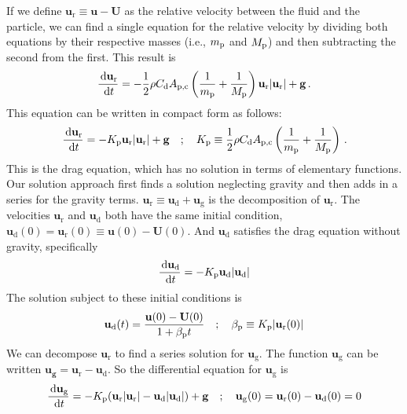 If we define $\mathbf{u}_\text{r} \equiv \mathbf{u} - \mathbf{U}$ as the relative velocity between the fluid and the particle, we can find a single equation for the relative velocity by dividing both equations by their respective masses (i.e., $m_{\rm p}$ and $M_{\rm p}$) and then subtracting the second from the first. This result is
\begin{align}
    \frac{\,\mathrm{d} \mathbf{u}_\text{r}}{\,\mathrm{d} t} = -\frac{1}{2} \rho C_\text{d} A_\text{p,c} \left(\frac{1}{m_{\rm p}} + \frac{1}{M_{\rm p}} \right) \mathbf{u}_\text{r} |\mathbf{u}_\text{r}| + \mathbf{g} \,.
\end{align}
This equation can be written in compact form as follows:
\begin{align}
    \frac{\,\mathrm{d} \mathbf{u}_\text{r}}{\,\mathrm{d} t} = -K_{\rm p} \mathbf{u}_\text{r} |\mathbf{u}_\text{r}| + \mathbf{g} \quad ; \quad K_{\rm p} \equiv \frac{1}{2} \rho C_\text{d} A_\text{p,c} \left(\frac{1}{m_{\rm p}} + \frac{1}{M_{\rm p}} \right) \,.
\end{align}
This is the drag equation, which has no solution in terms of elementary functions. Our solution approach first finds a solution neglecting gravity and then adds in a series for the gravity terms. $\mathbf{u}_\text{r} \equiv \mathbf{u}_\text{d} + \mathbf{u}_\text{g}$ is the decomposition of $\mathbf{u}_\text{r}$. The velocities $\mathbf{u}_\text{r}$ and $\mathbf{u}_\text{d}$ both have the same initial condition, $\mathbf{u}_\text{d}(0) = \mathbf{u}_\text{r}(0) \equiv \mathbf{u}(0) - \mathbf{U}(0)$. And $\mathbf{u}_\text{d}$ satisfies the drag equation without gravity, specifically
\begin{align}
    \frac{\,\mathrm{d} \mathbf{u}_\text{d}}{\,\mathrm{d} t} = -K_{\rm p} \mathbf{u}_\text{d} |\mathbf{u}_\text{d}|
\end{align}
The solution subject to these initial conditions is
\begin{align}
    \label{ud_exact}
    \mathbf{u}_\text{d}(t) = \frac{\mathbf{u}(0) - \mathbf{U}(0)}{1 + \beta_{\rm p} t} \quad ; \quad \beta_{\rm p} \equiv K_{\rm p} |\mathbf{u}_{\text{r}}(0)|
\end{align}
We can decompose $\mathbf{u}_\text{r}$ to find a series solution for $\mathbf{u}_\text{g}$. The function $\mathbf{u}_\text{g}$ can be written $\mathbf{u_g} = \mathbf{u}_\text{r} - \mathbf{u}_\text{d}$.  So the differential equation for $\mathbf{u}_\text{g}$ is
\begin{align}
    \frac{\,\mathrm{d} \mathbf{u}_\text{g}}{\,\mathrm{d} t} = -K_{\rm p} (\mathbf{u}_\text{r} |\mathbf{u}_\text{r}| - \mathbf{u}_\text{d} |\mathbf{u}_\text{d}|) + \mathbf{g} \quad ; \quad \mathbf{u}_\text{g}(0) = \mathbf{u}_\text{r}(0) - \mathbf{u}_\text{d}(0) = 0
\end{align}
